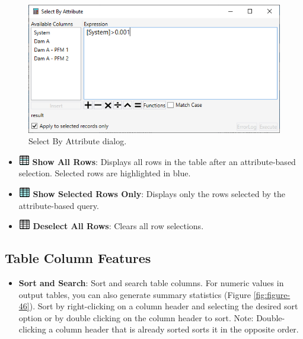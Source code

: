 \documentclass[
]{book}
\providecommand{\tightlist}{%
  \setlength{\itemsep}{0pt}\setlength{\parskip}{0pt}}
\begin{document}
\begin{figure}

{\centering \includegraphics{images/figure45} 

}

\caption{Select By Attribute dialog.}\label{fig:figure-45}
\end{figure}

\begin{itemize}
\item
  \includegraphics{images/showallrows.png} \textbf{Show All Rows}: Displays all rows in the table after an attribute-based selection. Selected rows are highlighted in blue.
\item
  \includegraphics{images/showselectedrows.png} \textbf{Show Selected Rows Only}: Displays only the rows selected by the attribute-based query.
\item
  \includegraphics{images/deselectrows.png} \textbf{Deselect All Rows}: Clears all row selections.
\end{itemize}

\hypertarget{table-column-features}{%
\subsection{Table Column Features}\label{table-column-features}}

\begin{itemize}
\tightlist
\item
  \textbf{Sort and Search}: Sort and search table columns. For numeric values in output tables, you can also generate summary statistics (Figure \ref{fig:figure-46}). Sort by right-clicking on a column header and selecting the desired sort option or by double clicking on the column header to sort. Note: Double-clicking a column header that is already sorted sorts it in the opposite order.
\end{itemize}
\end{document}
